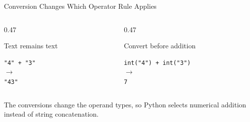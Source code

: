 \documentclass[aspectratio=169,10pt]{beamer}
\begin{document}
\begin{frame}{Conversion Changes Which Operator Rule Applies}

  \begin{columns}[T,onlytextwidth]

    \begin{column}{0.47\textwidth}

      \begin{block}{Text remains text}

        \centering
        \texttt{"4" + "3"}\\[0.10in]
        $\rightarrow$\\[0.10in]
        \texttt{"43"}

      \end{block}

    \end{column}

    \begin{column}{0.47\textwidth}

      \begin{block}{Convert before addition}

        \centering
        \texttt{int("4") + int("3")}\\[0.10in]
        $\rightarrow$\\[0.10in]
        \texttt{7}

      \end{block}

    \end{column}

  \end{columns}

  \begin{exampleblockcp}

    The conversions change the operand types, so Python selects numerical addition instead of string concatenation.

  \end{exampleblockcp}

\end{frame}
\end{document}

